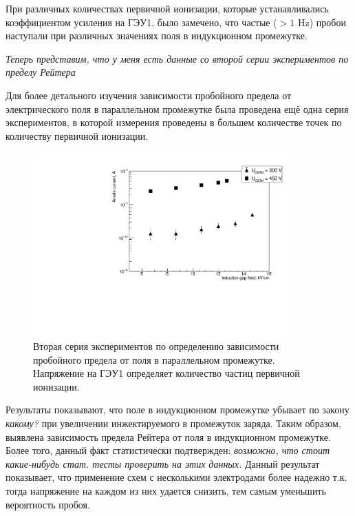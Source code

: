 При различных количествах первичной ионизации, которые устанавливались коэффициентом усиления на ГЭУ1, было замечено, что частые ($>1$ Hz)  пробои наступали при различных значениях поля в индукционном промежутке. 
\par
\textit{Теперь представим, что у меня есть данные со второй серии экспериментов по пределу Рейтера} 
\par Для более детального изучения зависимости пробойного предела от электрического поля в параллельном промежутке была проведена ещё одна серия экспериментов, в которой измерения проведены в большем количестве точек по количеству первичной ионизации. 

\begin{figure}[H]
	\begin{center}
		\includegraphics[width = 10cm]{img/Raether_graph_2.pdf}
		\caption{Вторая серия экспериментов по определению зависимости пробойного предела от поля в параллельном промежутке. Напряжение на ГЭУ1 определяет количество частиц первичной ионизации.}
		\label{Raether_graph_3}
	\end{center}
\end{figure}

Результаты показывают, что поле в индукционном промежутке убывает по закону \textit{какому?} при увеличении инжектируемого в промежуток заряда. Таким образом, выявлена зависимость предела Рейтера от поля в индукционном промежутке. Более того, данный факт статистически подтвержден: \textit{возможно, что стоит какие-нибудь стат. тесты проверить на этих данных.} Данный результат показывает, что применение схем с несколькими электродами более надежно т.к. тогда напряжение на каждом из них удается снизить, тем самым уменьшить вероятность пробоя. 

